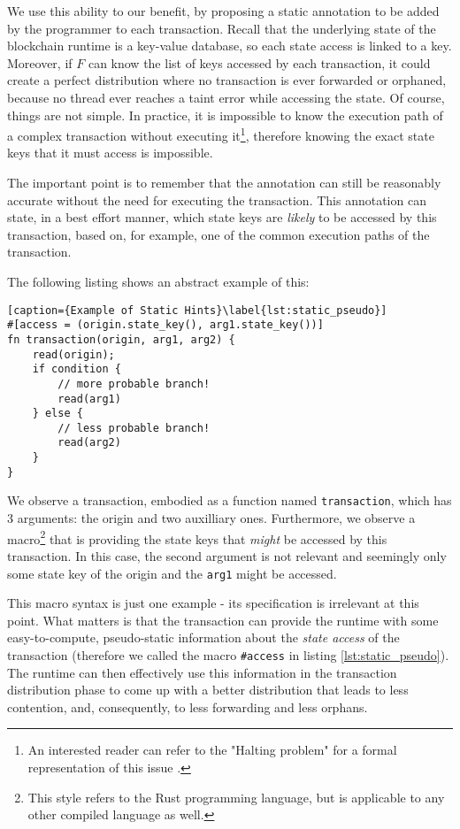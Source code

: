 We use this ability to our benefit, by proposing a static annotation to be added by the programmer
to each transaction. Recall that the underlying state of the blockchain runtime is a key-value
database, so each state access is linked to a key. Moreover, if $F$ can know the list of keys
accessed by each transaction, it could create a perfect distribution where no transaction is ever
forwarded or orphaned, because no thread ever reaches a taint error while accessing the state. Of
course, things are not simple. In practice, it is impossible to know the execution path of a complex
transaction without executing it\footnote{An interested reader can refer to the "Halting problem"
for a formal representation of this issue \cite{burkholderHaltingProblem1987}.}, therefore knowing
the exact state keys that it must access is impossible.

The important point is to remember that the annotation can still be reasonably accurate without the
need for executing the transaction. This annotation can state, in a best effort manner, which state
keys are \textit{likely} to be accessed by this transaction, based on, for example, one of the
common execution paths of the transaction.

The following listing shows an abstract example of this:

\begin{lstlisting}[caption={Example of Static Hints}\label{lst:static_pseudo}]
#[access = (origin.state_key(), arg1.state_key())]
fn transaction(origin, arg1, arg2) {
	read(origin);
	if condition {
		// more probable branch!
		read(arg1)
	} else {
		// less probable branch!
		read(arg2)
	}
}
\end{lstlisting}

We observe a transaction, embodied as a function named \texttt{transaction}, which has 3 arguments:
the origin and two auxilliary ones. Furthermore, we observe a macro\footnote{This style refers to the
Rust programming language, but is applicable to any other compiled language as well.} that is
providing the state keys that \textit{might} be accessed by this transaction. In this case, the
second argument is not relevant and seemingly only some state key of the origin and the
\texttt{arg1} might be accessed.

This macro syntax is just one example - its specification is irrelevant at this point. What matters is that the transaction can provide the runtime with some easy-to-compute, pseudo-static
information about the \textit{state access} of the transaction (therefore we called the macro
\texttt{\#access} in listing \ref{lst:static_pseudo}). The runtime can then effectively use this
information in the transaction distribution phase to come up with a better distribution that leads
to less contention, and, consequently, to less forwarding and less orphans.

